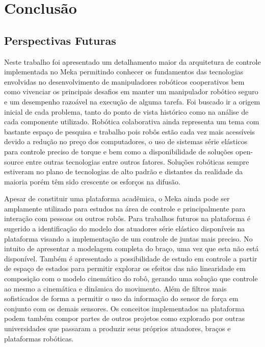\chapter{Conclusão} \label{ch:conclusoes}


\section{Perspectivas Futuras}

Neste trabalho foi apresentado um detalhamento maior da arquitetura de controle implementada no Meka permitindo conhecer os fundamentos das tecnologias envolvidas no desenvolvimento de manipuladores robóticos cooperativos bem como vivenciar os principais desafios em manter um manipulador robótico seguro e um desempenho razoável na execução de alguma tarefa. Foi buscado ir a origem inicial de cada problema, tanto do ponto de vista histórico como na análise de cada componente utilizado. Robótica colaborativa ainda representa um tema com bastante espaço de pesquisa e trabalho pois robôs estão cada vez mais acessíveis devido a redução no preço dos computadores, o uso de sistemas série elásticos para controle preciso de torque e bem como a disponibilidade de soluções open-source entre outras tecnologias entre outros fatores. Soluções robóticas sempre estiveram no plano de tecnologias de alto padrão e distantes da realidade da maioria porém têm sido crescente os esforços na difusão.

Apesar de constituir uma plataforma acadêmica, o Meka ainda pode ser amplamente utilizado para estudos na área de controle e principalmente para interação com pessoas ou outros robôs. Para trabalhos futuros na plataforma é sugerido a identificação do modelo dos atuadores série elástico disponíveis na plataforma visando a implementação de um controle de juntas mais preciso. No intuito de apresentar a modelagem completa do braço, uma vez que esta não está disponível. Também é apresentado a possibilidade de estudo em controle a partir de espaço de estados para permitir explorar os efeitos das não linearidade em composição com o modelo cinemático do robô, gerando uma solução que controle ao mesmo a cinemática e dinâmica do movimento. Além de filtros mais sofisticados de forma a permitir o uso da informação do sensor de força em conjunto com os demais sensores. Os conceitos implementados na plataforma podem também compor partes de outros projetos como explorado por outras universidades que passaram a produzir seus próprios atuadores, braços e plataformas robóticas.

